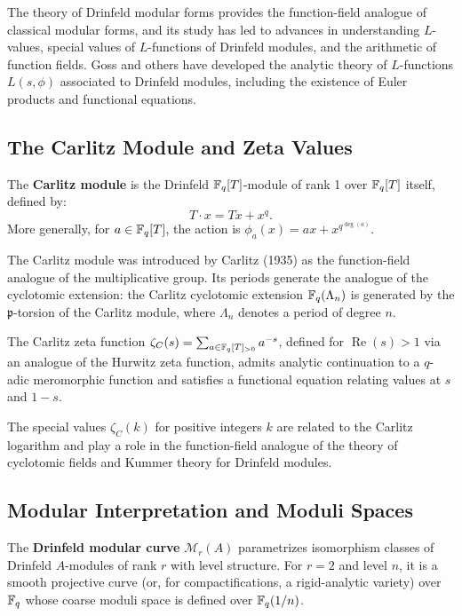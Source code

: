 \begin{remark}
The theory of Drinfeld modular forms provides the function-field analogue of classical modular forms, and its study has led to advances in understanding $L$-values, special values of $L$-functions of Drinfeld modules, and the arithmetic of function fields. Goss and others have developed the analytic theory of $L$-functions $L(s, \phi)$ associated to Drinfeld modules, including the existence of Euler products and functional equations.
\end{remark}

\subsection{The Carlitz Module and Zeta Values}

\begin{definition}
The \textbf{Carlitz module} is the Drinfeld $\mathbb{F}_q[T]$-module of rank 1 over $\mathbb{F}_q[T]$ itself, defined by:
\[
T \cdot x = Tx + x^q.
\]
More generally, for $a \in \mathbb{F}_q[T]$, the action is $\phi_a(x) = a x + x^{q^{\deg(a)}}$.
\end{definition}

The Carlitz module was introduced by Carlitz (1935) as the function-field analogue of the multiplicative group. Its periods generate the analogue of the cyclotomic extension: the Carlitz cyclotomic extension $\mathbb{F}_q(\Lambda_n)$ is generated by the $\mathfrak{p}$-torsion of the Carlitz module, where $\Lambda_n$ denotes a period of degree $n$.

\begin{theorem}[Goss, 1979]
The Carlitz zeta function $\zeta_C(s) = \sum_{a \in \mathbb{F}_q[T]_{>0}} a^{-s}$, defined for $\operatorname{Re}(s) > 1$ via an analogue of the Hurwitz zeta function, admits analytic continuation to a $q$-adic meromorphic function and satisfies a functional equation relating values at $s$ and $1 - s$.
\end{theorem}

The special values $\zeta_C(k)$ for positive integers $k$ are related to the Carlitz logarithm and play a role in the function-field analogue of the theory of cyclotomic fields and Kummer theory for Drinfeld modules.

\subsection{Modular Interpretation and Moduli Spaces}

\begin{definition}
The \textbf{Drinfeld modular curve} $\mathcal{M}_r(A)$ parametrizes isomorphism classes of Drinfeld $A$-modules of rank $r$ with level structure. For $r = 2$ and level $n$, it is a smooth projective curve (or, for compactifications, a rigid-analytic variety) over $\mathbb{F}_q$ whose coarse moduli space is defined over $\mathbb{F}_q(1/n)$.
\end{definition}

